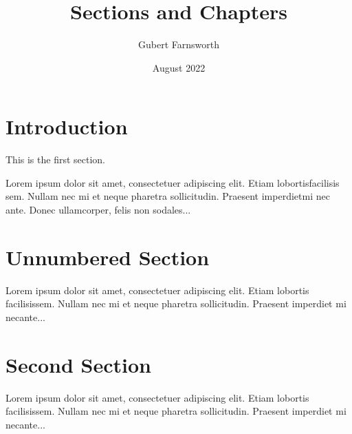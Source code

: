 \documentclass{article}
\title{Sections and Chapters}
\author{Gubert Farnsworth}
\date{August 2022}
\begin{document}
	
	\maketitle
	
	\tableofcontents
	
	\section{Introduction}
	
	This is the first section.
	
	Lorem  ipsum  dolor  sit  amet,  consectetuer  adipiscing  
	elit.   Etiam  lobortisfacilisis sem.  Nullam nec mi et 
	neque pharetra sollicitudin.  Praesent imperdietmi nec ante. 
	Donec ullamcorper, felis non sodales...
	
	\section*{Unnumbered Section}
	
	Lorem ipsum dolor sit amet, consectetuer adipiscing elit.  
	Etiam lobortis facilisissem.  Nullam nec mi et neque pharetra 
	sollicitudin.  Praesent imperdiet mi necante...
	
	\section{Second Section}
	
	Lorem ipsum dolor sit amet, consectetuer adipiscing elit.  
	Etiam lobortis facilisissem.  Nullam nec mi et neque pharetra 
	sollicitudin.  Praesent imperdiet mi necante...
\end{document}

